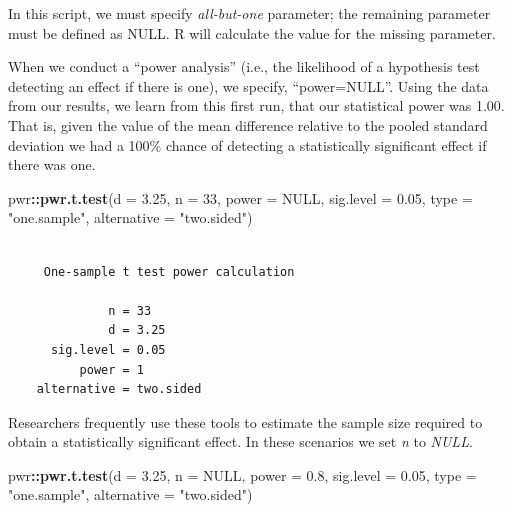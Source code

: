 \documentclass[
  11pt,
]{book}
\newenvironment{Shaded}{\begin{snugshade}}{\end{snugshade}}
\newcommand{\AttributeTok}[1]{\textcolor[rgb]{0.27,0.27,0.27}{#1}}
\newcommand{\ConstantTok}[1]{\textcolor[rgb]{0.37,0.37,0.37}{#1}}
\newcommand{\DecValTok}[1]{\textcolor[rgb]{0.06,0.06,0.06}{#1}}
\newcommand{\FloatTok}[1]{\textcolor[rgb]{0.06,0.06,0.06}{#1}}
\newcommand{\FunctionTok}[1]{\textcolor[rgb]{0.27,0.27,0.27}{\textbf{#1}}}
\newcommand{\NormalTok}[1]{#1}
\newcommand{\SpecialCharTok}[1]{\textcolor[rgb]{0.43,0.43,0.43}{\textbf{#1}}}
\newcommand{\StringTok}[1]{\textcolor[rgb]{0.5,0.5,0.5}{#1}}
\begin{document}
In this script, we must specify \emph{all-but-one} parameter; the remaining parameter must be defined as NULL. R will calculate the value for the missing parameter.

When we conduct a ``power analysis'' (i.e., the likelihood of a hypothesis test detecting an effect if there is one), we specify, ``power=NULL''. Using the data from our results, we learn from this first run, that our statistical power was 1.00. That is, given the value of the mean difference relative to the pooled standard deviation we had a 100\% chance of detecting a statistically significant effect if there was one.

\begin{Shaded}
\begin{Highlighting}[]
\NormalTok{pwr}\SpecialCharTok{::}\FunctionTok{pwr.t.test}\NormalTok{(}\AttributeTok{d =} \FloatTok{3.25}\NormalTok{, }\AttributeTok{n =} \DecValTok{33}\NormalTok{, }\AttributeTok{power =} \ConstantTok{NULL}\NormalTok{, }\AttributeTok{sig.level =} \FloatTok{0.05}\NormalTok{, }\AttributeTok{type =} \StringTok{"one.sample"}\NormalTok{,}
    \AttributeTok{alternative =} \StringTok{"two.sided"}\NormalTok{)}
\end{Highlighting}
\end{Shaded}

\begin{verbatim}

     One-sample t test power calculation 

              n = 33
              d = 3.25
      sig.level = 0.05
          power = 1
    alternative = two.sided
\end{verbatim}

Researchers frequently use these tools to estimate the sample size required to obtain a statistically significant effect. In these scenarios we set \emph{n} to \emph{NULL}.

\begin{Shaded}
\begin{Highlighting}[]
\NormalTok{pwr}\SpecialCharTok{::}\FunctionTok{pwr.t.test}\NormalTok{(}\AttributeTok{d =} \FloatTok{3.25}\NormalTok{, }\AttributeTok{n =} \ConstantTok{NULL}\NormalTok{, }\AttributeTok{power =} \FloatTok{0.8}\NormalTok{, }\AttributeTok{sig.level =} \FloatTok{0.05}\NormalTok{, }\AttributeTok{type =} \StringTok{"one.sample"}\NormalTok{,}
    \AttributeTok{alternative =} \StringTok{"two.sided"}\NormalTok{)}
\end{Highlighting}
\end{Shaded}
\end{document}

